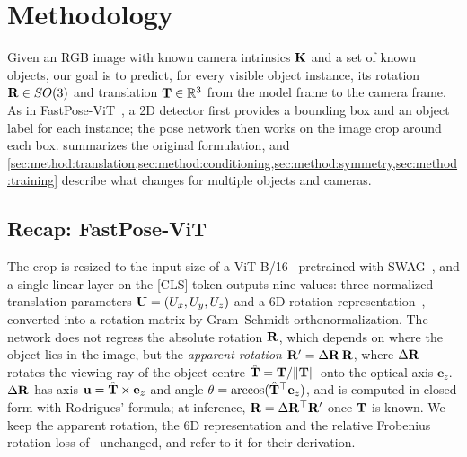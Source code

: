 \section{Methodology}
\label{sec:method}

Given an RGB image with known camera intrinsics $\mathbf{K}$ and a set of known objects, our goal is to
predict, for every visible object instance, its rotation $\mathbf{R} \in SO(3)$ and translation
$\mathbf{T} \in \mathbb{R}^3$ from the model frame to the camera frame. As in
FastPose-ViT~\cite{ancey2026fastposevit}, a 2D detector first provides a bounding box and an
object label for each instance; the pose network then works on the image crop around each box.
 summarizes the original formulation, and
\cref{sec:method:translation,sec:method:conditioning,sec:method:symmetry,sec:method:training}
describe what changes for multiple objects and cameras.

\subsection{Recap: FastPose-ViT}
\label{sec:method:recap}
The crop is resized to the input size of a ViT-B/16~\cite{dosovitskiy2021vit} pretrained with
SWAG~\cite{singh2022swag}, and a single linear layer on the [CLS] token outputs nine values: three
normalized translation parameters $\mathbf{U} = (U_x, U_y, U_z)$ and a 6D rotation
representation~\cite{zhou2019continuity}, converted into a rotation matrix by Gram--Schmidt
orthonormalization. The network does not regress the absolute rotation $\mathbf{R}$, which depends on
where the object lies in the image, but the \emph{apparent rotation}
$\mathbf{R}' = \Delta\mathbf{R}\,\mathbf{R}$, where $\Delta\mathbf{R}$ rotates the viewing ray of the object centre
$\hat{\mathbf{T}} = \mathbf{T} / \|\mathbf{T}\|$ onto the optical axis $\mathbf{e}_z$. $\Delta\mathbf{R}$ has axis
$\mathbf{u} = \hat{\mathbf{T}} \times \mathbf{e}_z$ and angle $\theta = \arccos(\hat{\mathbf{T}}^\top
\mathbf{e}_z)$, and is computed in closed form with Rodrigues' formula; at inference,
$\mathbf{R} = \Delta\mathbf{R}^\top \mathbf{R}'$ once $\mathbf{T}$ is known. We keep the apparent rotation, the 6D
representation and the relative Frobenius rotation loss of~\cite{ancey2026fastposevit} unchanged,
and refer to it for their derivation.

